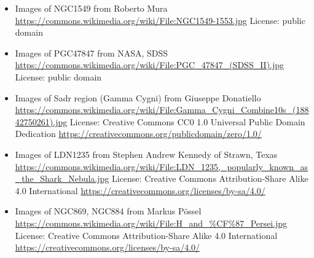 \begin{itemize}
	 from ESO/VPHAS+ team
	 \url{https://commons.wikimedia.org/wiki/File:There_is_an_impostor_in_this_nebula_(potw2518a).jpg}
	 License: Creative Commons Attribution 4.0 International \url{https://creativecommons.org/licenses/by/4.0/}
\item Images of NGC1549
	 from Roberto Mura
	 \url{https://commons.wikimedia.org/wiki/File:NGC1549-1553.jpg}
	 License: public domain
\item Images of PGC47847
	 from NASA, SDSS
	 \url{https://commons.wikimedia.org/wiki/File:PGC_47847_(SDSS_II).jpg}
	 License: public domain
\item Images of Sadr region (Gamma Cygni)
	 from Giuseppe Donatiello
	 \url{https://commons.wikimedia.org/wiki/File:Gamma_Cygni_Combine10s_(18842750261).jpg}
	 License: Creative Commons CC0 1.0 Universal Public Domain Dedication \url{https://creativecommons.org/publicdomain/zero/1.0/}
\item Images of LDN1235
	 from Stephen Andrew Kennedy of Strawn, Texas
	 \url{https://commons.wikimedia.org/wiki/File:LDN_1235,_popularly_known_as_the_Shark_Nebula.jpg}
	 License: Creative Commons Attribution-Share Alike 4.0 International \url{https://creativecommons.org/licenses/by-sa/4.0/}
\item Images of NGC869, NGC884
	 from Markus Pössel
	 \url{https://commons.wikimedia.org/wiki/File:H_and_%CF%87_Persei.jpg}
	 License: Creative Commons Attribution-Share Alike 4.0 International \url{https://creativecommons.org/licenses/by-sa/4.0/}
\end{itemize}

